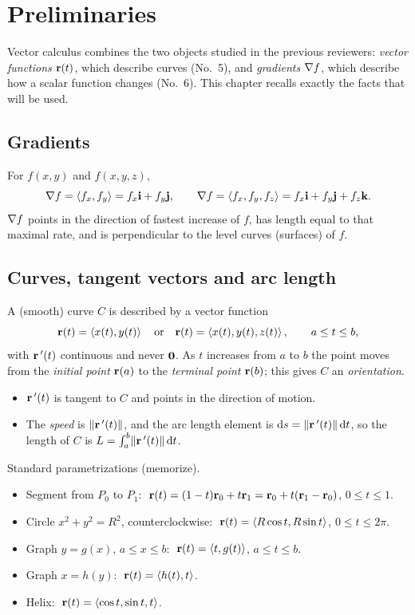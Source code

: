 \section{Preliminaries}\label{ch:prelim}

Vector calculus combines the two objects studied in the previous reviewers:
\emph{vector functions} $\mathbf{r}(t)$, which describe curves (No.~5), and
\emph{gradients} $\nabla f$, which describe how a scalar function changes
(No.~6). This chapter recalls exactly the facts that will be used.

\subsection{Gradients}

For $f(x,y)$ and $f(x,y,z)$,
\[
  \nabla f=\left\langle f_x,f_y \right\rangle=f_x\mathbf{i}+f_y\mathbf{j},\qquad
  \nabla f=\left\langle f_x,f_y,f_z \right\rangle=f_x\mathbf{i}+f_y\mathbf{j}+f_z\mathbf{k} .
\]
$\nabla f$ points in the direction of fastest increase of $f$, has length equal
to that maximal rate, and is perpendicular to the level curves (surfaces) of
$f$.

\subsection{Curves, tangent vectors and arc length}

A (smooth) curve $C$ is described by a vector function
\[
  \mathbf{r}(t)=\left\langle x(t),y(t) \right\rangle\quad\text{or}\quad\mathbf{r}(t)=\left\langle x(t),y(t),z(t) \right\rangle,\qquad a\le t\le b,
\]
with $\mathbf{r}\,'(t)$ continuous and never $\mathbf{0}$. As $t$ increases from $a$ to $b$
the point moves from the \emph{initial point} $\mathbf{r}(a)$ to the \emph{terminal
point} $\mathbf{r}(b)$; this gives $C$ an \emph{orientation}.
\begin{itemize}
  \item $\mathbf{r}\,'(t)$ is tangent to $C$ and points in the direction of motion.
  \item The \emph{speed} is $\lVert\mathbf{r}\,'(t)\rVert$, and the arc length element is
        $\mathrm{d} s=\lVert\mathbf{r}\,'(t)\rVert\,\mathrm{d} t$, so the length of $C$ is
        $L=\int_a^b\lVert\mathbf{r}\,'(t)\rVert\,\mathrm{d} t$.
\end{itemize}

\begin{strategy}{Standard parametrizations (memorize).}
\begin{itemize}
  \item Segment from $P_0$ to $P_1$: $\;\mathbf{r}(t)=(1-t)\mathbf{r}_0+t\mathbf{r}_1=\mathbf{r}_0+t(\mathbf{r}_1-\mathbf{r}_0)$, $0\le t\le1$.
  \item Circle $x^2+y^2=R^2$, counterclockwise: $\;\mathbf{r}(t)=\left\langle R\cos t,R\sin t \right\rangle$, $0\le t\le2\pi$.
  \item Graph $y=g(x)$, $a\le x\le b$: $\;\mathbf{r}(t)=\left\langle t,g(t) \right\rangle$, $a\le t\le b$.
  \item Graph $x=h(y)$: $\;\mathbf{r}(t)=\left\langle h(t),t \right\rangle$.
  \item Helix: $\;\mathbf{r}(t)=\left\langle \cos t,\sin t,t \right\rangle$.
\end{itemize}
\end{strategy}

